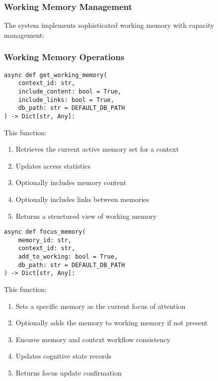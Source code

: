 \documentclass[12pt,a4paper]{article}
\begin{document}
\subsubsection*{Working Memory Management}

The system implements sophisticated working memory with capacity management:

\subsubsection*{Working Memory Operations}
\begin{pageablecode}
\begin{verbatim}
async def get_working_memory(
    context_id: str,
    include_content: bool = True,
    include_links: bool = True,
    db_path: str = DEFAULT_DB_PATH
) -> Dict[str, Any]:
\end{verbatim}
\end{pageablecode}
This function:
\begin{enumerate}[label=\arabic*.]
    \item Retrieves the current active memory set for a context
    \item Updates access statistics
    \item Optionally includes memory content
    \item Optionally includes links between memories
    \item Returns a structured view of working memory
\end{enumerate}

\begin{pageablecode}
\begin{verbatim}
async def focus_memory(
    memory_id: str,
    context_id: str,
    add_to_working: bool = True,
    db_path: str = DEFAULT_DB_PATH
) -> Dict[str, Any]:
\end{verbatim}
\end{pageablecode}
This function:
\begin{enumerate}[label=\arabic*.]
    \item Sets a specific memory as the current focus of attention
    \item Optionally adds the memory to working memory if not present
    \item Ensures memory and context workflow consistency
    \item Updates cognitive state records
    \item Returns focus update confirmation
\end{enumerate}
\end{document}
